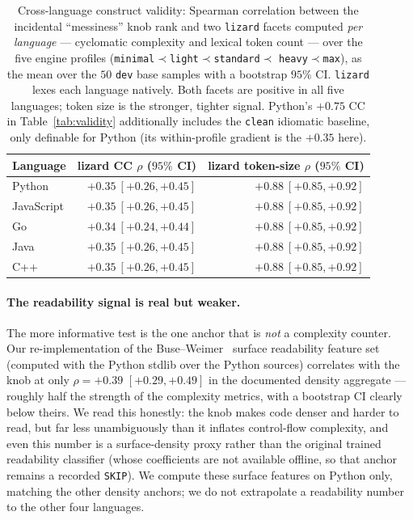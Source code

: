 \begin{table}[t]
\centering
\caption{Cross-language construct validity: Spearman correlation between the incidental
``messiness'' knob rank and two \texttt{lizard} facets computed \emph{per language} ---
cyclomatic complexity and lexical token count --- over the five engine profiles
(\texttt{minimal}${}\prec{}$\texttt{light}${}\prec{}$\texttt{standard}${}\prec{}$%
\texttt{heavy}${}\prec{}$\texttt{max}), as the mean over the $50$ \texttt{dev} base samples
with a bootstrap $95\%$ CI. \texttt{lizard} lexes each language natively. Both facets are
positive in all five languages; token size is the stronger, tighter signal. Python's
$+0.75$ CC in Table~\ref{tab:validity} additionally includes the \texttt{clean} idiomatic
baseline, only definable for Python (its within-profile gradient is the $+0.35$ here).}
\label{tab:validity-xlang}
\begin{tabular}{@{}lrr@{}}
\toprule
Language & lizard CC $\rho$ ($95\%$ CI) & lizard token-size $\rho$ ($95\%$ CI) \\
\midrule
Python      & $+0.35\ [+0.26,+0.45]$ & $+0.88\ [+0.85,+0.92]$ \\
JavaScript  & $+0.35\ [+0.26,+0.45]$ & $+0.88\ [+0.85,+0.92]$ \\
Go          & $+0.34\ [+0.24,+0.44]$ & $+0.88\ [+0.85,+0.92]$ \\
Java        & $+0.35\ [+0.26,+0.45]$ & $+0.88\ [+0.85,+0.92]$ \\
C++         & $+0.35\ [+0.26,+0.45]$ & $+0.88\ [+0.85,+0.92]$ \\
\bottomrule
\end{tabular}
\end{table}

\paragraph{The readability signal is real but weaker.}
The more informative test is the one anchor that is \emph{not} a complexity counter. Our
re-implementation of the Buse--Weimer~\citep{buse2010readability} surface readability
feature set (computed with the Python stdlib over the Python sources) correlates with the
knob at only $\rho=+0.39$ $[+0.29,+0.49]$ in the documented density aggregate --- roughly
half the strength of the complexity metrics, with a bootstrap CI clearly below theirs. We
read this honestly: the knob makes code denser and
harder to read, but far less unambiguously than it inflates control-flow complexity, and
even this number is a surface-density proxy rather than the original trained readability
classifier (whose coefficients are not available offline, so that anchor remains a
recorded \texttt{SKIP}). We compute these surface features on Python only, matching the
other density anchors; we do not extrapolate a readability number to the other four
languages.

